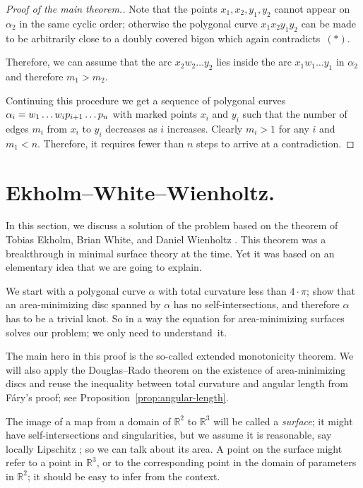 \documentclass{article}
\newcommand*{\arXiv}[2]{#1} %
\newcommand*{\z}[1]{#1\nobreak\discretionary{}%
            {\hbox{$\mathsurround=0pt #1$}}{}}
\theoremstyle{theorem}
\newtheorem{Crofton-type formula}[theorem]{Crofton-type formula}
\newtheorem{Douglas--Rado theorem}[theorem]{\arXiv{Douglas--Rado theorem}{Theorem}}
\newtheorem{Extended monotonicity theorem}[theorem]{\arXiv{Extended monotonicity theorem}{Theorem}}
\theoremstyle{definition}
\begin{document}
\begin{proof}[Proof of \arXiv{the main theorem}{Main Theorem}.]
Note that the points $x_1,x_2,y_1,y_2$ cannot appear on $\alpha_2$ in the same cyclic order;
otherwise the polygonal curve $x_1x_2y_1y_2$ can be made to be arbitrarily close to a doubly covered bigon which again contradicts~$\arXiv{({*})}{(1)}$.

Therefore, we can assume that the arc $x_2w_2\dots y_2$ lies inside the arc $x_1w_1\dots y_1$ in $\alpha_2$
and therefore $m_1>m_2$.

Continuing this procedure we get a sequence of polygonal curves $\alpha_i\z=w_1\z\dots w_i p_{i+1}\z\dots p_n$ with marked points $x_i$ and $y_i$ such that the number of edges $m_i$ from $x_i$ to $y_i$ decreases as $i$ increases.
Clearly $m_i>1$ for any $i$ and $m_1<n$.
Therefore, it requires fewer than $n$ steps to arrive at a contradiction.
\end{proof}

\section{Ekholm--White--Wienholtz.}

In this section, we discuss a solution of the problem based on the theorem of Tobias Ekholm, Brian White, and Daniel Wienholtz \cite{EWW_embed}.
This theorem was a breakthrough in minimal surface theory at the time.
Yet it was based on an elementary idea that we are going to explain.

We start with a polygonal curve $\alpha$ with total curvature less than $4\arXiv{{\cdot}}{}\pi$;
show that an area-minimizing disc spanned by $\alpha$ has no self-intersections, and therefore $\alpha$ has to be a trivial knot.
So in a way the equation for area-minimizing surfaces solves our problem; we only need to understand~it.

The main hero in this proof is the so-called extended monotonicity theorem.
We will also apply the Douglas--Rado theorem on the existence of area-minimizing discs and reuse the inequality between total curvature and angular length from Fáry's proof; see Proposition~\ref{prop:angular-length}.

The image of a map from a domain of $\mathbb{R}^2$ to $\mathbb{R}^3$ will be called a \emph{surface};
it might have self-intersections and singularities, but we assume it is reasonable, say locally Lipschitz \cite{wiki:lipschitz}; so we can talk about its area.
A point on the surface might refer to a point in $\mathbb{R}^3$, or to the corresponding point in the domain of parameters in $\mathbb{R}^2$;
it should be easy to infer from the context.
\end{document}
